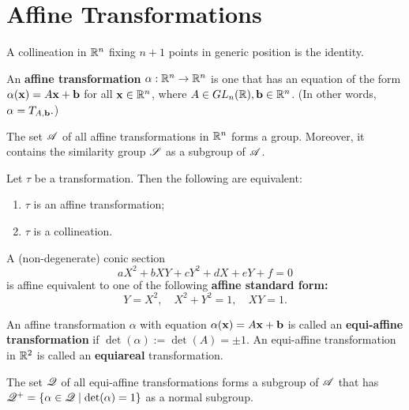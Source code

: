 \section{Affine Transformations}

\begin{theorem}
    A collineation in \(\mathbb{R}^n\) fixing \(n + 1\) points in generic position is the identity.
\end{theorem}

\begin{definition}
    An \textbf{affine transformation} \(\alpha : \mathbb{R}^n \to \mathbb{R}^n\) is one that has an equation of the form \(\alpha(\mathbf{x}) = A\mathbf{x} + \mathbf{b}\) for all \(\mathbf{x} \in \mathbb{R}^n\), where \(A \in GL_n(\mathbb{R}), \mathbf{b} \in \mathbb{R}^n\). (In other words, \(\alpha = T_{A, \mathbf{b}}.\))
\end{definition}

\begin{lemma}
    The set \(\mathscr{A}\) of all affine transformations in \(\mathbb{R}^n\) forms a group. Moreover, it contains the similarity group \(\mathscr{S}\) as a subgroup of \(\mathscr{A}\).
\end{lemma}

\begin{theorem}
    Let \(\tau\) be a transformation. Then the following are equivalent:
    \begin{enumerate}
        \item \(\tau\) is an affine transformation;
        \item \(\tau\) is a collineation.
    \end{enumerate}
\end{theorem}

\begin{proposition}
    A (non-degenerate) conic section
    \[aX^2 + bXY + cY^2 +dX + eY + f = 0\]
    is affine equivalent to one of the following \textbf{affine standard form:}
    \[Y = X^2, \quad X^2 + Y^2 = 1, \quad XY = 1.\]
\end{proposition}

\begin{definition}
    An affine transformation \(\alpha\) with equation \(\alpha(\mathbf{x}) = A\mathbf{x} + \mathbf{b}\) is called an \textbf{equi-affine transformation} if \(\det(\alpha) := \det(A) = \pm 1\). An equi-affine transformation in \(\mathbb{R}^2\) is called an \textbf{equiareal} transformation.
\end{definition}

\begin{proposition}
    The set \(\mathscr{Q}\) of all equi-affine transformations forms a subgroup of \(\mathscr{A}\) that has \(\mathscr{Q}^+ = \{\alpha \in \mathscr{Q} \mid \det(\alpha) = 1 \}\) as a normal subgroup.
\end{proposition}

